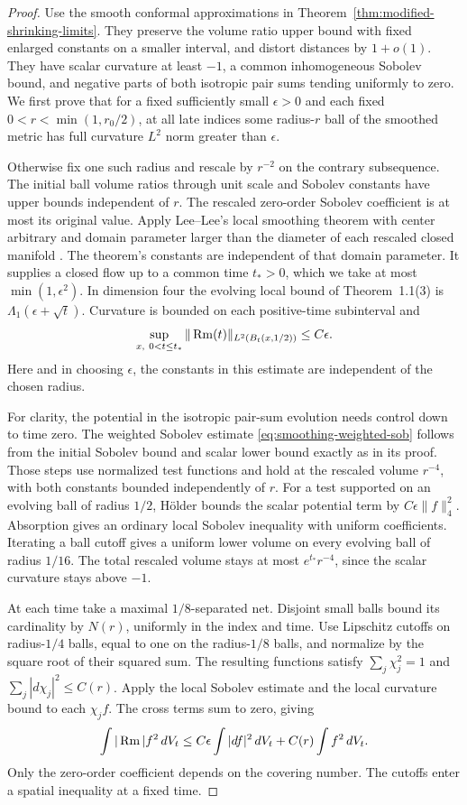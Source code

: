 \begin{proof}
Use the smooth conformal approximations in
Theorem~\ref{thm:modified-shrinking-limits}. They preserve the
volume ratio upper bound with fixed enlarged constants on a smaller
interval, and distort distances by \(1+o(1)\). They have scalar
curvature at least \(-1\), a common inhomogeneous Sobolev bound,
and negative parts of both isotropic pair sums tending uniformly
to zero. We first prove that for a fixed sufficiently small
\(\epsilon>0\) and each fixed \(0<r<\min(1,r_0/2)\), at all late
indices some radius-\(r\) ball of the smoothed metric has full
curvature \(L^2\) norm greater than \(\epsilon\).

Otherwise fix one such radius and rescale by \(r^{-2}\) on the
contrary subsequence. The initial ball volume ratios through unit
scale and Sobolev constants have upper bounds independent of \(r\).
The rescaled zero-order Sobolev coefficient is at most its original
value. Apply Lee--Lee's local smoothing theorem with center arbitrary
and domain parameter larger than the diameter of each rescaled
closed manifold \cite[Theorem~1.1]{LeeLee2026Local}.
The theorem's constants are independent of that domain parameter.
It supplies a closed flow up to a common time \(t_*>0\), which we
take at most \(\min(1,\epsilon^2)\). In dimension four the evolving local bound of Theorem~1.1(3) is \(\Lambda_1(\epsilon+\sqrt{t})\). Curvature is bounded on each positive-time
subinterval and
\[
 \sup_{x,\ 0<t\le t_*}
 \|\operatorname{Rm}(t)\|_{L^2(B_t(x,1/2))}\le C\epsilon .
\]
Here and in choosing \(\epsilon\), the constants in this estimate
are independent of the chosen radius.

For clarity, the potential in the isotropic pair-sum evolution needs
control down to time zero. The weighted Sobolev estimate
\eqref{eq:smoothing-weighted-sob} follows from the initial Sobolev
bound and scalar lower bound exactly as in its proof. Those steps
use normalized test functions and hold at the rescaled volume
\(r^{-4}\), with both constants bounded independently of \(r\).
For a test supported on an evolving ball of radius \(1/2\),
H\"older bounds the scalar potential term by
\(C\epsilon\|f\|_4^2\). Absorption gives an ordinary local
Sobolev inequality with uniform coefficients. Iterating a ball
cutoff gives a uniform lower volume on every evolving ball of
radius \(1/16\). The total rescaled volume stays at most
\(e^{t_*}r^{-4}\), since the scalar curvature stays above \(-1\).

At each time take a maximal \(1/8\)-separated net. Disjoint small
balls bound its cardinality by \(N(r)\), uniformly in the index
and time. Use Lipschitz cutoffs on radius-\(1/4\) balls, equal
to one on the radius-\(1/8\) balls, and normalize by the square
root of their squared sum. The resulting functions satisfy
\(\sum_j\chi_j^2=1\) and \(\sum_j|d\chi_j|^2\le C(r)\).
Apply the local Sobolev estimate and the local curvature bound to
each \(\chi_j f\). The cross terms sum to zero, giving
\[
 \int |\operatorname{Rm}| f^2\,dV_t
 \le C\epsilon\int |df|^2\,dV_t
     +C(r)\int f^2\,dV_t .
\]
Only the zero-order coefficient depends on the covering number.
The cutoffs enter a spatial inequality at a fixed time.


\end{proof}

